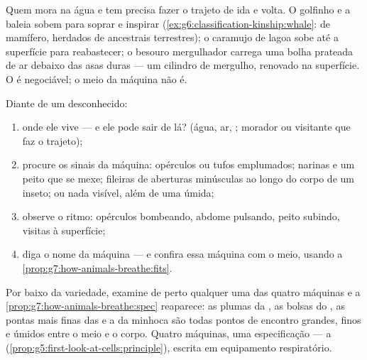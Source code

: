 \begin{example}\label{ex:g7:how-animals-breathe:airinwater}
Quem mora na água e tem  precisa fazer o trajeto de ida e
volta. O golfinho e a baleia sobem para soprar e inspirar
(\cref{ex:g6:classification-kinship:whale}:  de mamífero,
herdados de ancestrais terrestres); o caramujo de lagoa sobe até a
superfície para reabastecer; o besouro mergulhador carrega uma bolha
prateada de ar debaixo das asas duras --- um cilindro de mergulho,
renovado na superfície. O  é negociável; o meio da máquina não é.
\end{example}

\begin{method}\label{met:g7:how-animals-breathe:read}
Diante de um  desconhecido:
\begin{enumerate}
  \item onde ele vive --- e ele pode sair de lá? (água, ar, ;
        morador ou visitante que faz o trajeto);
  \item procure os sinais da máquina: opérculos ou tufos emplumados;
        narinas e um peito que se mexe; fileiras de aberturas
        minúsculas ao longo do corpo de um inseto; ou nada visível,
        além de uma  úmida;
  \item observe o ritmo: opérculos bombeando, abdome pulsando, peito
        subindo, visitas à superfície;
  \item diga o nome da máquina --- e confira essa máquina com o meio,
        usando a \cref{prop:g7:how-animals-breathe:fits}.
\end{enumerate}
\end{method}

\begin{remark}\label{rem:g7:how-animals-breathe:same}
Por baixo da variedade, examine de perto qualquer uma das quatro
máquinas e a \cref{prop:g7:how-animals-breathe:spec} reaparece: as
plumas da , as bolsas do , as pontas mais finas das
 e a  da minhoca são todas pontos de encontro grandes,
finos e úmidos entre o meio e o corpo. Quatro máquinas, uma
especificação --- a 
(\cref{prop:g5:first-look-at-cells:principle}), escrita em equipamento
respiratório.
\end{remark}

